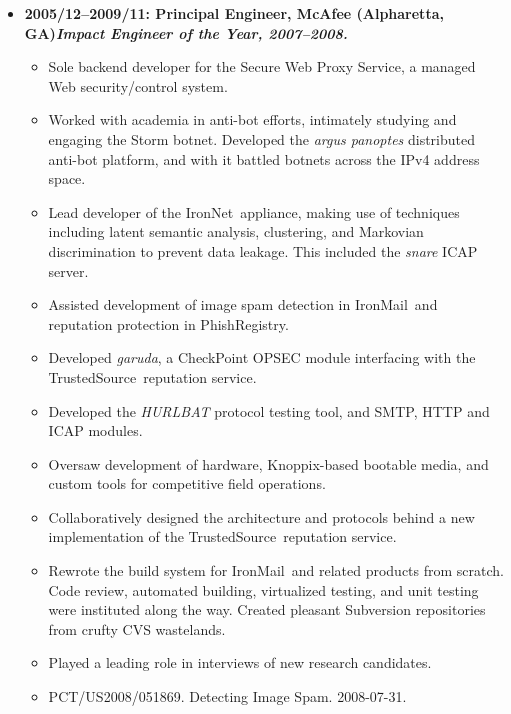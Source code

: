 \documentclass{article}
\newenvironment{tightitemize}
{\begin{itemize}
  \setlength{\itemsep}{1pt}
  \setlength{\parskip}{0pt}
  \setlength{\parsep}{0pt}}
{\end{itemize}}
\begin{document}
\begin{tightitemize}
\item \textbf{2005/12--2009/11: Principal Engineer, McAfee (Alpharetta, GA)\hfill \tiny{\textit{Impact Engineer of the Year, 2007--2008.}}}
\begin{tightitemize}
\item Sole backend developer for the Secure Web Proxy Service, a managed Web
  security/control system.
\item Worked with academia in anti-bot efforts, intimately studying and engaging
  the Storm botnet. Developed the \textit{argus panoptes} distributed anti-bot
  platform, and with it battled botnets across the IPv4 address space.
\item Lead developer of the IronNet\texttrademark\ appliance, making use of techniques
  including latent semantic analysis, clustering, and Markovian discrimination
  to prevent data leakage. This included the \textit{snare} ICAP server.
\item Assisted development of image spam detection in IronMail\texttrademark\ and
  reputation protection in PhishRegistry\texttrademark.
\item Developed \textit{garuda}, a CheckPoint\textsuperscript{\textregistered} OPSEC module interfacing with the
  TrustedSource\texttrademark\ reputation service.
\item Developed the \textit{HURLBAT} protocol testing tool, and SMTP, HTTP and ICAP modules.
\item Oversaw development of hardware, Knoppix\textsuperscript{\textregistered}-based bootable media, and custom tools for competitive field operations.
\item Collaboratively designed the architecture and protocols behind a new
  implementation of the TrustedSource\texttrademark\ reputation service.
\item Rewrote the build system for IronMail\texttrademark\ and related products from scratch.
  Code review, automated building, virtualized testing, and unit testing were
  instituted along the way. Created pleasant Subversion repositories from
  crufty CVS wastelands.
\item Played a leading role in interviews of new research candidates.
\item PCT/US2008/051869. Detecting Image Spam. 2008-07-31.\hfill{}\\
\end{tightitemize}

\pagebreak


\end{tightitemize}
\end{document}
